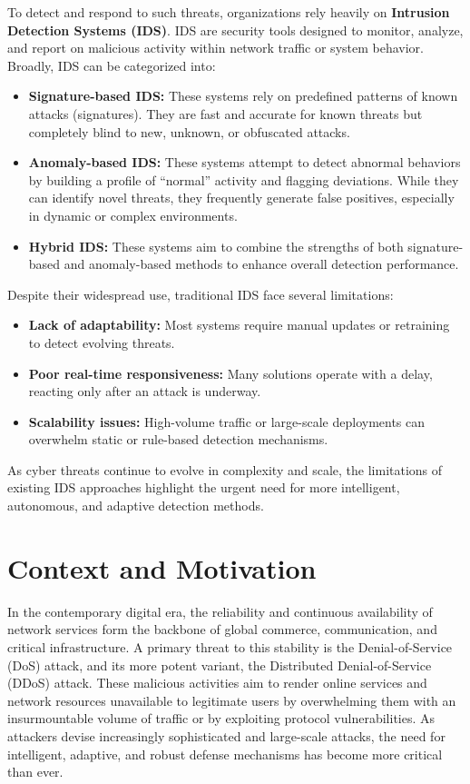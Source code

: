 \documentclass[12pt]{report}
\begin{document}
To detect and respond to such threats, organizations rely heavily on \textbf{Intrusion Detection Systems (IDS)}. IDS are security tools designed to monitor, analyze, and report on malicious activity within network traffic or system behavior. Broadly, IDS can be categorized into:

\begin{itemize}
    \item \textbf{Signature-based IDS:} These systems rely on predefined patterns of known attacks (signatures). They are fast and accurate for known threats but completely blind to new, unknown, or obfuscated attacks.

    \item \textbf{Anomaly-based IDS:} These systems attempt to detect abnormal behaviors by building a profile of ``normal'' activity and flagging deviations. While they can identify novel threats, they frequently generate false positives, especially in dynamic or complex environments.

    \item \textbf{Hybrid IDS:} These systems aim to combine the strengths of both signature-based and anomaly-based methods to enhance overall detection performance.
\end{itemize}

Despite their widespread use, traditional IDS face several limitations:

\begin{itemize}
    \item \textbf{Lack of adaptability:} Most systems require manual updates or retraining to detect evolving threats.

    \item \textbf{Poor real-time responsiveness:} Many solutions operate with a delay, reacting only after an attack is underway.

    \item \textbf{Scalability issues:} High-volume traffic or large-scale deployments can overwhelm static or rule-based detection mechanisms.
\end{itemize}

As cyber threats continue to evolve in complexity and scale, the limitations of existing IDS approaches highlight the urgent need for more intelligent, autonomous, and adaptive detection methods.


\section{Context and Motivation}
In the contemporary digital era, the reliability and continuous availability of network services form the backbone of global commerce, communication, and critical infrastructure. A primary threat to this stability is the Denial-of-Service (DoS) attack, and its more potent variant, the Distributed Denial-of-Service (DDoS) attack. These malicious activities aim to render online services and network resources unavailable to legitimate users by overwhelming them with an insurmountable volume of traffic or by exploiting protocol vulnerabilities. As attackers devise increasingly sophisticated and large-scale attacks, the need for intelligent, adaptive, and robust defense mechanisms has become more critical than ever.
\end{document}
